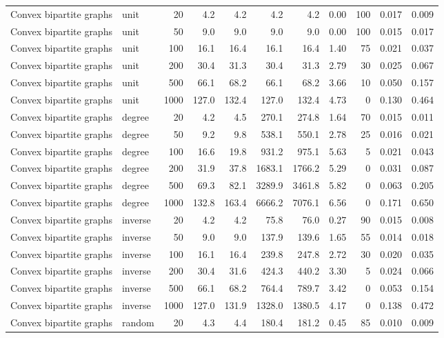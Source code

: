 \begin{tabular}{llrrrrrrrrr}
Convex bipartite graphs & unit & 20 & 4.2 & 4.2 & 4.2 & 4.2 & 0.00 & 100 & 0.017 & 0.009 \\
Convex bipartite graphs & unit & 50 & 9.0 & 9.0 & 9.0 & 9.0 & 0.00 & 100 & 0.015 & 0.017 \\
Convex bipartite graphs & unit & 100 & 16.1 & 16.4 & 16.1 & 16.4 & 1.40 & 75 & 0.021 & 0.037 \\
Convex bipartite graphs & unit & 200 & 30.4 & 31.3 & 30.4 & 31.3 & 2.79 & 30 & 0.025 & 0.067 \\
Convex bipartite graphs & unit & 500 & 66.1 & 68.2 & 66.1 & 68.2 & 3.66 & 10 & 0.050 & 0.157 \\
Convex bipartite graphs & unit & 1000 & 127.0 & 132.4 & 127.0 & 132.4 & 4.73 & 0 & 0.130 & 0.464 \\
Convex bipartite graphs & degree & 20 & 4.2 & 4.5 & 270.1 & 274.8 & 1.64 & 70 & 0.015 & 0.011 \\
Convex bipartite graphs & degree & 50 & 9.2 & 9.8 & 538.1 & 550.1 & 2.78 & 25 & 0.016 & 0.021 \\
Convex bipartite graphs & degree & 100 & 16.6 & 19.8 & 931.2 & 975.1 & 5.63 & 5 & 0.021 & 0.043 \\
Convex bipartite graphs & degree & 200 & 31.9 & 37.8 & 1683.1 & 1766.2 & 5.29 & 0 & 0.031 & 0.087 \\
Convex bipartite graphs & degree & 500 & 69.3 & 82.1 & 3289.9 & 3461.8 & 5.82 & 0 & 0.063 & 0.205 \\
Convex bipartite graphs & degree & 1000 & 132.8 & 163.4 & 6666.2 & 7076.1 & 6.56 & 0 & 0.171 & 0.650 \\
Convex bipartite graphs & inverse & 20 & 4.2 & 4.2 & 75.8 & 76.0 & 0.27 & 90 & 0.015 & 0.008 \\
Convex bipartite graphs & inverse & 50 & 9.0 & 9.0 & 137.9 & 139.6 & 1.65 & 55 & 0.014 & 0.018 \\
Convex bipartite graphs & inverse & 100 & 16.1 & 16.4 & 239.8 & 247.8 & 2.72 & 30 & 0.020 & 0.035 \\
Convex bipartite graphs & inverse & 200 & 30.4 & 31.6 & 424.3 & 440.2 & 3.30 & 5 & 0.024 & 0.066 \\
Convex bipartite graphs & inverse & 500 & 66.1 & 68.2 & 764.4 & 789.7 & 3.42 & 0 & 0.053 & 0.154 \\
Convex bipartite graphs & inverse & 1000 & 127.0 & 131.9 & 1328.0 & 1380.5 & 4.17 & 0 & 0.138 & 0.472 \\
Convex bipartite graphs & random & 20 & 4.3 & 4.4 & 180.4 & 181.2 & 0.45 & 85 & 0.010 & 0.009 \\

\end{tabular}
